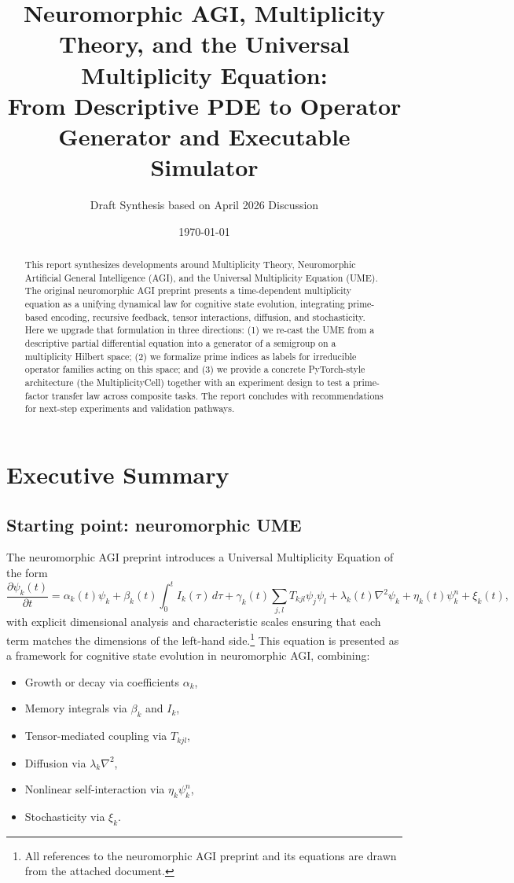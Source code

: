 \documentclass[11pt]{article}
\title{Neuromorphic AGI, Multiplicity Theory, and the Universal Multiplicity Equation:\\
From Descriptive PDE to Operator Generator and Executable Simulator}
\author{Draft Synthesis based on April 2026 Discussion}
\date{\today}
\begin{document}
\maketitle

\begin{abstract}
This report synthesizes developments around Multiplicity Theory, Neuromorphic Artificial General Intelligence (AGI), and the Universal Multiplicity Equation (UME). The original neuromorphic AGI preprint presents a time-dependent multiplicity equation as a unifying dynamical law for cognitive state evolution, integrating prime-based encoding, recursive feedback, tensor interactions, diffusion, and stochasticity. Here we upgrade that formulation in three directions: (1) we re-cast the UME from a descriptive partial differential equation into a generator of a semigroup on a multiplicity Hilbert space; (2) we formalize prime indices as labels for irreducible operator families acting on this space; and (3) we provide a concrete PyTorch-style architecture (the MultiplicityCell) together with an experiment design to test a prime-factor transfer law across composite tasks. The report concludes with recommendations for next-step experiments and validation pathways.
\end{abstract}

\tableofcontents

\section{Executive Summary}

\subsection{Starting point: neuromorphic UME}

The neuromorphic AGI preprint introduces a Universal Multiplicity Equation of the form
\begin{equation}
\frac{\partial \psi_k(t)}{\partial t}
= \alpha_k(t)\psi_k
+ \beta_k(t)\int_0^t I_k(\tau)\,d\tau
+ \gamma_k(t)\sum_{j,l} T_{kjl}\psi_j\psi_l
+ \lambda_k(t)\nabla^2\psi_k
+ \eta_k(t)\psi_k^n
+ \xi_k(t),
\label{eq:UME-coordinate}
\end{equation}
with explicit dimensional analysis and characteristic scales ensuring that each term matches the dimensions of the left-hand side.\footnote{All references to the neuromorphic AGI preprint and its equations are drawn from the attached document.} This equation is presented as a framework for cognitive state evolution in neuromorphic AGI, combining:
\begin{itemize}[nosep]
\item Growth or decay via coefficients $\alpha_k$,
\item Memory integrals via $\beta_k$ and $I_k$,
\item Tensor-mediated coupling via $T_{kjl}$,
\item Diffusion via $\lambda_k\nabla^2$,
\item Nonlinear self-interaction via $\eta_k\psi_k^n$,
\item Stochasticity via $\xi_k$.
\end{itemize}
\end{document}
